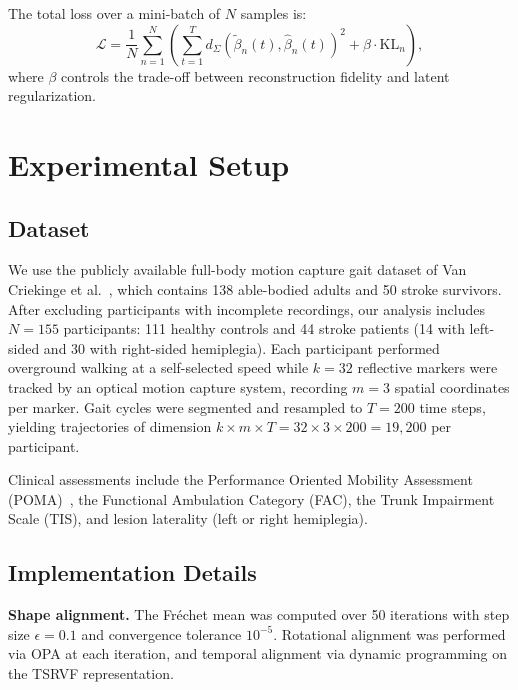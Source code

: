 \documentclass{article}
\begin{document}
The total loss over a mini-batch of $N$ samples is:
\begin{equation}
\mathcal{L} = \frac{1}{N}\sum_{n=1}^{N}\left(\sum_{t=1}^{T} d_\Sigma(\tilde{\beta}_n(t), \hat{\beta}_n(t))^2 + \beta \cdot \mathrm{KL}_n\right),
\label{eq:total_loss}
\end{equation}
where $\beta$ controls the trade-off between reconstruction fidelity and latent regularization.

\section{Experimental Setup}
\label{sec:experiments}

\subsection{Dataset}
We use the publicly available full-body motion capture gait dataset of Van Criekinge et al.~\cite{van2023full}, which contains 138 able-bodied adults and 50 stroke survivors. After excluding participants with incomplete recordings, our analysis includes $N = 155$ participants: 111 healthy controls and 44 stroke patients (14 with left-sided and 30 with right-sided hemiplegia). Each participant performed overground walking at a self-selected speed while $k = 32$ reflective markers were tracked by an optical motion capture system, recording $m = 3$ spatial coordinates per marker. Gait cycles were segmented and resampled to $T = 200$ time steps, yielding trajectories of dimension $k \times m \times T = 32 \times 3 \times 200 = 19{,}200$ per participant.

Clinical assessments include the Performance Oriented Mobility Assessment (POMA)~\cite{van2023full}, the Functional Ambulation Category (FAC), the Trunk Impairment Scale (TIS), and lesion laterality (left or right hemiplegia).

\subsection{Implementation Details}

\textbf{Shape alignment.} The Fr\'{e}chet mean was computed over 50 iterations with step size $\epsilon = 0.1$ and convergence tolerance $10^{-5}$. Rotational alignment was performed via OPA at each iteration, and temporal alignment via dynamic programming on the TSRVF representation.
\end{document}

